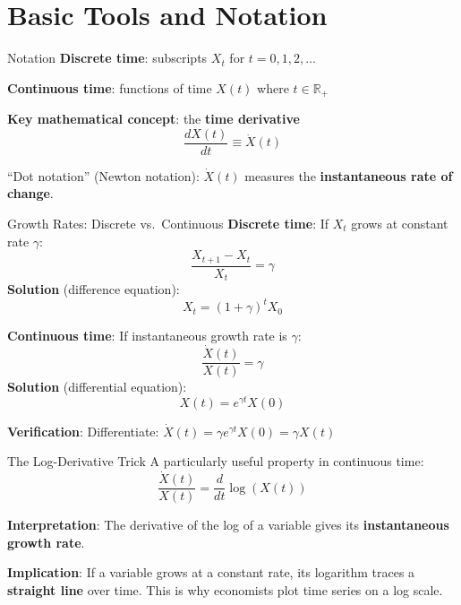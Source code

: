 \documentclass[blue]{beamer}
\begin{document}
\section{Basic Tools and Notation}

\begin{frame}{Notation}
	\textbf{Discrete time}: subscripts $X_t$ for $t = 0, 1, 2, \ldots$
	
	\textbf{Continuous time}: functions of time $X(t)$ where $t \in \mathbb{R}_+$
	
	\bigskip
	\textbf{Key mathematical concept}: the \textbf{time derivative}
	\[
	\frac{dX(t)}{dt} \equiv \dot{X}(t)
	\]
	
	``Dot notation'' (Newton notation): $\dot{X}(t)$ measures the \textbf{instantaneous rate of change}.
\end{frame}

\begin{frame}{Growth Rates: Discrete vs.\ Continuous}
	\textbf{Discrete time}: If $X_t$ grows at constant rate $\gamma$:
	\[
	\frac{X_{t+1} - X_t}{X_t} = \gamma
	\]
	\textbf{Solution} (difference equation):
	\[
	X_t = (1+\gamma)^t X_0
	\]
	
	\bigskip
	\textbf{Continuous time}: If instantaneous growth rate is $\gamma$:
	\[
	\frac{\dot{X}(t)}{X(t)} = \gamma
	\]
	\textbf{Solution} (differential equation):
	\[
	X(t) = e^{\gamma t} X(0)
	\]
	
	\textbf{Verification}: Differentiate: $\dot{X}(t) = \gamma e^{\gamma t} X(0) = \gamma X(t)$
\end{frame}

\begin{frame}{The Log-Derivative Trick}
	A particularly useful property in continuous time:
	\[
	{\frac{\dot{X}(t)}{X(t)} = \frac{d}{dt}\log(X(t))}
	\]
	
	\textbf{Interpretation}: The derivative of the log of a variable gives its \textbf{instantaneous growth rate}.
	
	\bigskip
	\textbf{Implication}: If a variable grows at a constant rate, its logarithm traces a \textbf{straight line} over time. This is why economists plot time series on a log scale.
\end{frame}
\end{document}
